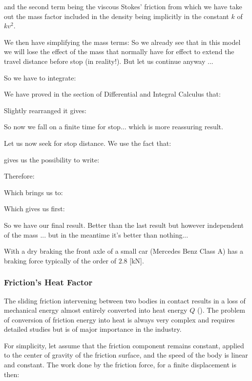 	and the second term being the viscous Stokes' friction from which we have take out the mass factor included in the density being implicitly in the constant $k$ of $kv^2$.

	We then have simplifying the mass terms:
	So we already see that in this model we will lose the effect of the mass that normally have for effect to extend the travel distance before stop (in reality!). But let us continue anyway ...

	So we have to integrate:
	
	We have proved in the section of Differential and Integral Calculus that:
	
	Slightly rearranged it gives:
	
	So now we fall on a finite time for stop... which is more reassuring result.

	Let us now seek for stop distance. We use the fact that:
	
	gives us the possibility to write:
	
	Therefore:
	
	Which brings us to:
	
	Which gives us first:
	
	So we have our final result. Better than the last result but however independent of the mass ... but in the meantime it's better than nothing...
	
	\begin{tcolorbox}[title=Remark,colframe=black,arc=10pt]
	With a dry braking the front axle of a small car (Mercedes Benz Class A) has a braking force typically of the order of $2.8$ [kN].
	\end{tcolorbox}
	
	\pagebreak
	\subsubsection{Friction's Heat Factor}
	The sliding friction intervening between two bodies in contact results in a loss of mechanical energy almost entirely converted into heat energy $Q$ (). The problem of conversion of friction energy into heat is always very complex and requires detailed studies but is of major importance in the industry.

	For simplicity, let assume that the friction component remains constant, applied to the center of gravity of the friction surface, and the speed of the body is linear and constant. The work done by the friction force, for a finite displacement is then:
	
